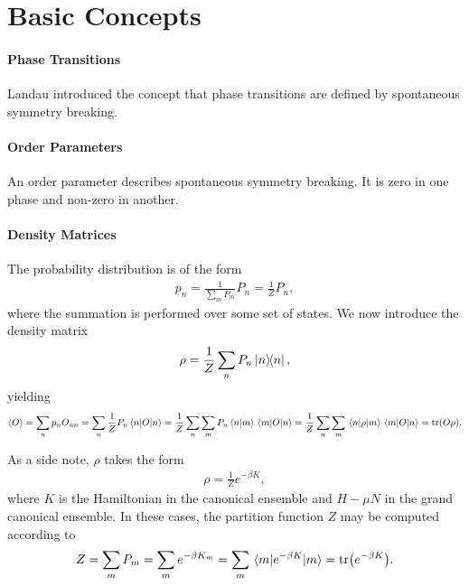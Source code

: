 \section{Basic Concepts}

\paragraph{Phase Transitions}
Landau introduced the concept that phase transitions are defined by spontaneous symmetry breaking.

\paragraph{Order Parameters}
An order parameter describes spontaneous symmetry breaking. It is zero in one phase and non-zero in another.

\paragraph{Density Matrices}
The probability distribution is of the form
\begin{align*}
	p_{n} = \frac{1}{\sum\limits_{m}P_{m}}P_{n} = \frac{1}{Z}P_{n},
\end{align*}
where the summation is performed over some set of states. We now introduce the density matrix
\begin{align*}
	\rho = \frac{1}{Z}\sum\limits_{n}P_{n}\op{n}{n},
\end{align*}
yielding
\begin{align*}
	\expval{O} = \sum\limits_{n}p_{n}O_{nn} = \sum\limits_{n}\frac{1}{Z}P_{n}\expval{O}{n} = \frac{1}{Z}\sum\limits_{n}\sum\limits_{m}P_{n}\braket{n}{m}\mel{m}{O}{n} = \frac{1}{Z}\sum\limits_{n}\sum\limits_{m}\mel{n}{\rho}{m}\mel{m}{O}{n} = \tr(O\rho).
\end{align*}

As a side note, $\rho$ takes the form
\begin{align*}
	\rho = \frac{1}{Z}e^{-\beta K},
\end{align*}
where $K$ is the Hamiltonian in the canonical ensemble and $H - \mu N$ in the grand canonical ensemble. In these cases, the partition function $Z$ may be computed according to
\begin{align*}
	Z = \sum\limits_{m}P_{m} = \sum\limits_{m}e^{-\beta K_{m}} = \sum\limits_{m}\mel{m}{e^{-\beta K}}{m} = \tr(e^{-\beta K}).
\end{align*}

